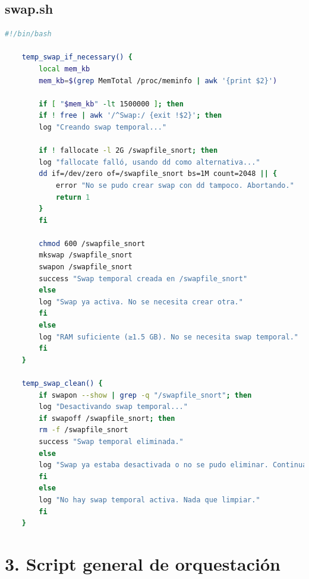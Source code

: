 \documentclass[11pt,a4paper,twoside]{report}
\begin{document}
\subsection*{swap.sh}
\begin{lstlisting}[language=bash, caption={\texttt{swap.sh}}, label={lst:swap-sh}]
	#!/bin/bash
	
	temp_swap_if_necessary() {
		local mem_kb
		mem_kb=$(grep MemTotal /proc/meminfo | awk '{print $2}')
		
		if [ "$mem_kb" -lt 1500000 ]; then
		if ! free | awk '/^Swap:/ {exit !$2}'; then
		log "Creando swap temporal..."
		
		if ! fallocate -l 2G /swapfile_snort; then
		log "fallocate falló, usando dd como alternativa..."
		dd if=/dev/zero of=/swapfile_snort bs=1M count=2048 || {
			error "No se pudo crear swap con dd tampoco. Abortando."
			return 1
		}
		fi
		
		chmod 600 /swapfile_snort
		mkswap /swapfile_snort
		swapon /swapfile_snort
		success "Swap temporal creada en /swapfile_snort"
		else
		log "Swap ya activa. No se necesita crear otra."
		fi
		else
		log "RAM suficiente (≥1.5 GB). No se necesita swap temporal."
		fi
	}
	
	temp_swap_clean() {
		if swapon --show | grep -q "/swapfile_snort"; then
		log "Desactivando swap temporal..."
		if swapoff /swapfile_snort; then
		rm -f /swapfile_snort
		success "Swap temporal eliminada."
		else
		log "Swap ya estaba desactivada o no se pudo eliminar. Continuando."
		fi
		else
		log "No hay swap temporal activa. Nada que limpiar."
		fi
	}
\end{lstlisting}

\section*{3. Script general de orquestación}
\end{document}
